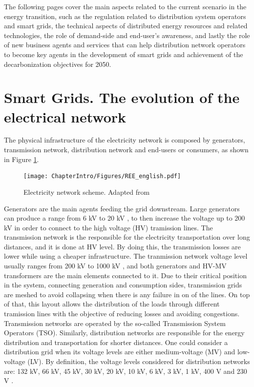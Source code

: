 The following pages cover the main aspects related to the current scenario in the energy transition, such as the regulation related to distribution system operators and smart grids, the technical aspects of distributed energy resources and related technologies, the role of demand-side and end-user's awareness, and lastly the role of new business agents and services that can help distribution network operators to become key agents in the development of smart grids and achievement of the decarbonization objectives for 2050. 


\section{Smart Grids. The evolution of the electrical network}

The physical infrastructure of the electricity network is composed by generators, transmission network, distribution network and end-users or consumers, as shown in Figure \ref{fig:ree}. 

\begin{figure}[htbp]
	\centering 
	\texttt{[image: ChapterIntro/Figures/REE\_english.pdf]}
		\caption{Electricity network scheme. Adapted from \cite{RedElectricadeEspana}}  
		\label{fig:ree}
\end{figure}

Generators are the main agents feeding the grid downstream. Large generators can produce a range from 6 kV to 20 kV \cite{Gomez-Exposito2008}, to then increase the voltage up to 200 kV in order to connect to the high voltage (HV) tramission lines. The transmission network is the responsible for the electricity transportation over long distances, and it is done at HV level. By doing this, the transmission losses are lower while using a cheaper infrastructure. The tranmission network voltage level usually ranges from 200 kV to 1000 kV \cite{Erbach2016}, and both generators and HV-MV transformers are the main elements connected to it. Due to their critical position in the system, connecting generation and consumption sides, transmission grids are meshed to avoid collapsing when there is any failure in on of the lines. On top of that, this layout allows the distribution of the loads through different tramission lines with the objective of reducing losses and avoiding congestions. Transmission networks are operated by the so-called Transmission System Operators (TSO). Similarly, distribution networks are responsible for the energy distribution and transportation for shorter distances. One could consider a distribution grid when its voltage levels are either medium-voltage (MV) and low-voltage (LV). By definition, the voltage levels considered for distribution networks are: 132 kV, 66 kV, 45 kV, 30 kV, 20 kV, 10 kV, 6 kV, 3 kV, 1 kV, 400 V and 230 V \cite{Gomez-Exposito2008, Erbach2016}. 

